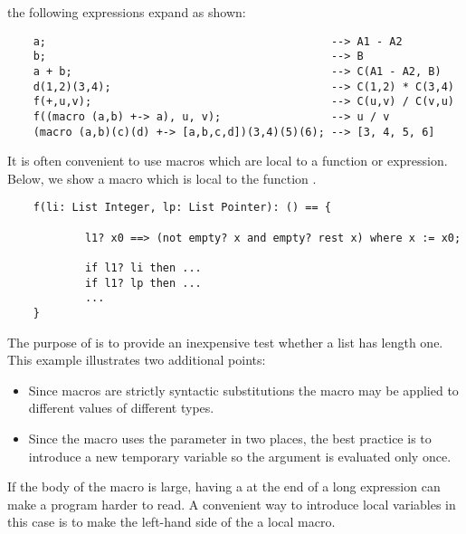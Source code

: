 the following expressions expand as shown:

\begin{small}
\begin{verbatim}
    a;                                            --> A1 - A2
    b;                                            --> B
    a + b;                                        --> C(A1 - A2, B)
    d(1,2)(3,4);                                  --> C(1,2) * C(3,4)
    f(+,u,v);                                     --> C(u,v) / C(v,u)
    f((macro (a,b) +-> a), u, v);                 --> u / v
    (macro (a,b)(c)(d) +-> [a,b,c,d])(3,4)(5)(6); --> [3, 4, 5, 6]
\end{verbatim}
\end{small}


It is often convenient to use macros which are local to a function
or expression.  Below, we show a macro  which is
local to the function .

\begin{small}
\begin{verbatim}
    f(li: List Integer, lp: List Pointer): () == {

            l1? x0 ==> (not empty? x and empty? rest x) where x := x0;

            if l1? li then ...
            if l1? lp then ...
            ...
    }
\end{verbatim}
\end{small}
The purpose of  is to provide an inexpensive test
whether a list has length one.
This example illustrates two additional points:
\begin{itemize}
\item
   Since macros are strictly syntactic substitutions the 
   macro may be applied to different values of different types.
\item
   Since the macro uses the parameter in two places, the best practice
   is to introduce a new temporary variable so the argument is evaluated
   only once.
\end{itemize}

If the body of the macro is large, having a  at the end of
a long expression can make a program harder to read.
A convenient way to introduce local variables in this case is to make
the left-hand side of the  a local macro.

